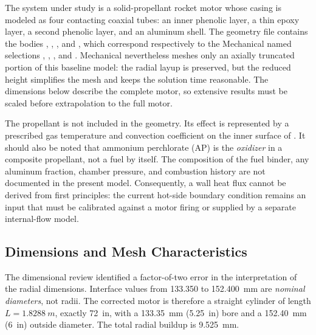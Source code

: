 \documentclass[oneside,openany]{amsdtx}
\begin{document}
The system under study is a solid-propellant rocket motor whose casing is modeled
as four contacting coaxial tubes: an inner phenolic layer, a thin epoxy layer, a
second phenolic layer, and an aluminum shell. The geometry file contains the
bodies , , , and , which
correspond respectively to the Mechanical named selections ,
, , and . Mechanical nevertheless meshes only
an axially truncated portion of this baseline model: the radial layup is
preserved, but the reduced height simplifies the mesh and keeps the solution
time reasonable. The dimensions below describe the complete motor, so extensive
results must be scaled before extrapolation to the full motor.

The propellant is not included in the geometry. Its effect is represented by a
prescribed gas temperature and convection coefficient on the inner surface of
. It should also be noted that ammonium perchlorate (AP) is the
\emph{oxidizer} in a composite propellant, not a fuel by itself. The composition
of the fuel binder, any aluminum fraction, chamber pressure, and combustion
history are not documented in the present model. Consequently, a wall heat flux
cannot be derived from first principles: the current hot-side boundary condition
remains an input that must be calibrated against a motor firing or supplied by a
separate internal-flow model.

\subsection{Dimensions and Mesh Characteristics}

The dimensional review identified a factor-of-two error in the interpretation
of the radial dimensions. Interface values from 133.350 to \SI{152.400}{mm}
are \emph{nominal diameters}, not radii. The corrected motor is therefore a
straight cylinder of length \(L=\SI{1.8288}{m}\), exactly \SI{72}{in}, with a
\SI{133.35}{mm} (\SI{5.25}{in}) bore and a \SI{152.40}{mm} (\SI{6}{in})
outside diameter. The total radial buildup is \SI{9.525}{mm}.

\begin{center}
\end{center}
\end{document}
